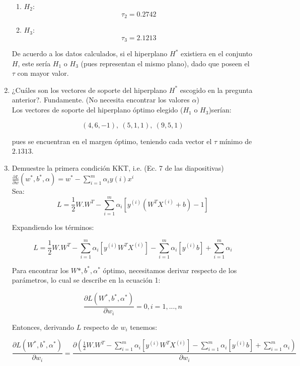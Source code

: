 \documentclass[paper=a4, fontsize=11pt]{scrartcl}
\numberwithin{equation}{section}		%
\numberwithin{figure}{section}			%
\numberwithin{table}{section}				%
\begin{document}
\begin{enumerate}
\begin{enumerate}
        \item $H_2$:
                $$\tau_2 = 0.2742$$
                
        \item $H_3$:
                $$\tau_3 = 2.1213$$
    \end{enumerate}
    
    De acuerdo a los datos calculados, si el hiperplano $H^*$ existiera en el conjunto $H$, este sería $H_1$ o $H_3$ (pues representan el mismo plano), dado que poseen el $\tau$ con mayor valor.
    
    \item ¿Cuáles son los vectores de soporte del hiperplano $H^*$ escogido en la pregunta anterior?. Fundamente. (No necesita encontrar los valores $\alpha$)\\
    
    Los vectores de soporte del hiperplano óptimo elegido ($H_1$ o $H_3$)serían:
    
    $$(4,6,-1),\ (5,1,1),\ (9,5,1)$$
    
    pues se encuentran en el margen óptimo, teniendo cada vector el $\tau$ mínimo de $2.1313$.\\
    
    \item Demuestre la primera condición KKT, i.e. (Ec. 7 de las diapositivas) $\frac{\partial L}{\partial w}(w^*, b^*, \alpha) = w^* - \sum_{i=1}^{m}\alpha_iy(i)x^{i}$\\
    
    Sea: $$L = \frac{1}{2}W.W^T - \sum_{i=1}^{m}\alpha_i[y^{(i)}(W^{T}X^{(i)} + b) - 1]$$
    
    Expandiendo los términos:
    
    $$L = \frac{1}{2}W.W^T - \sum_{i=1}^{m}\alpha_i[y^{(i)}W^{T}X^{(i)}] - \sum_{i=1}^{m}\alpha_i[y^{(i)}b] + \sum_{i=1}^{m}\alpha_i$$
    
    Para encontrar los $W*, b^*, \alpha^*$ óptimo, necesitamos derivar respecto de los parámetros, lo cual se describe en la ecuación 1:
    
    $$\frac{\partial L(W^*, b^*, \alpha^* )}{\partial w_i}=0, i=1,...,n$$
    
    Entonces, derivando $L$ respecto de $w_i$ tenemos:
    
    $$\frac{\partial L(W^*, b^*, \alpha^* )}{\partial w_i}=\frac{\partial (\frac{1}{2}W.W^T - \sum_{i=1}^{m}\alpha_i[y^{(i)}W^{T}X^{(i)}] - \sum_{i=1}^{m}\alpha_i[y^{(i)}b] + \sum_{i=1}^{m}\alpha_i)}{\partial w_i}$$
    

\end{enumerate}
\end{document}
